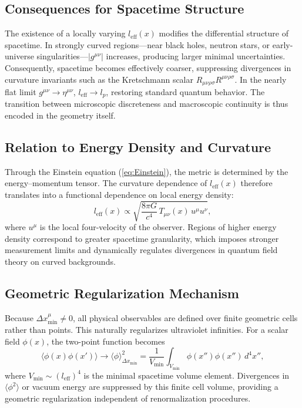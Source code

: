 \documentclass[11pt,oneside]{book}
\numberwithin{equation}{chapter}
\begin{document}
\subsection*{Consequences for Spacetime Structure}

The existence of a locally varying $l_{\text{eff}}(x)$ modifies the differential structure of spacetime.  
In strongly curved regions—near black holes, neutron stars, or early-universe singularities—$|g^{\mu\nu}|$ increases, producing larger minimal uncertainties.  
Consequently, spacetime becomes effectively coarser, suppressing divergences in curvature invariants such as the Kretschmann scalar $R_{\mu\nu\rho\sigma}R^{\mu\nu\rho\sigma}$.  
In the nearly flat limit $g^{\mu\nu}\rightarrow\eta^{\mu\nu}$, $l_{\text{eff}}\rightarrow l_p$, restoring standard quantum behavior.  
The transition between microscopic discreteness and macroscopic continuity is thus encoded in the geometry itself.

\subsection*{Relation to Energy Density and Curvature}

Through the Einstein equation (\ref{eq:Einstein}), the metric is determined by the energy--momentum tensor.  
The curvature dependence of $l_{\text{eff}}(x)$ therefore translates into a functional dependence on local energy density:
\begin{equation}
l_{\text{eff}}(x)\propto
\sqrt{\frac{8\pi G}{c^4}\,T_{\mu\nu}(x)\,u^{\mu}u^{\nu}},
\label{eq:leffT}
\end{equation}
where $u^{\mu}$ is the local four-velocity of the observer.  
Regions of higher energy density correspond to greater spacetime granularity, which imposes stronger measurement limits and dynamically regulates divergences in quantum field theory on curved backgrounds.

\subsection*{Geometric Regularization Mechanism}

Because $\Delta x_{\min}^{\mu}\neq 0$, all physical observables are defined over finite geometric cells rather than points.  
This naturally regularizes ultraviolet infinities.  
For a scalar field $\phi(x)$, the two-point function becomes
\begin{equation}
\langle \phi(x)\phi(x')\rangle
\rightarrow
\langle \phi\rangle_{\Delta x_{\min}}^2
=\frac{1}{V_{\min}}\int_{V_{\min}}\!\phi(x'')\phi(x'')\,d^4x'',
\end{equation}
where $V_{\min}\sim(l_{\text{eff}})^4$ is the minimal spacetime volume element.  
Divergences in $\langle\phi^2\rangle$ or vacuum energy are suppressed by this finite cell volume, providing a geometric regularization independent of renormalization procedures.
\end{document}
